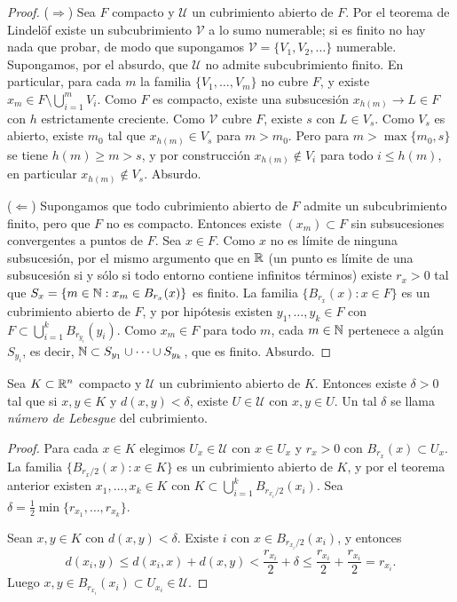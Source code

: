 \begin{proof}
  (\(\Rightarrow\)) Sea \(F\) compacto y \(\mathscr{U}\) un cubrimiento abierto de \(F\). Por el teorema de Lindelöf existe un subcubrimiento \(\mathscr{V}\) a lo sumo numerable; si es finito no hay nada que probar, de modo que supongamos \(\mathscr{V} = \{ V_1, V_2, \dots \}\) numerable. Supongamos, por el absurdo, que \(\mathscr{U}\) no admite subcubrimiento finito. En particular, para cada \(m\) la familia \(\{ V_1, \dots, V_m \}\) no cubre \(F\), y existe \(x_m \in F \setminus \bigcup_{i=1}^{m} V_i\). Como \(F\) es compacto, existe una subsucesión \(x_{h(m)} \to L \in F\) con \(h\) estrictamente creciente. Como \(\mathscr{V}\) cubre \(F\), existe \(s\) con \(L \in V_s\). Como \(V_s\) es abierto, existe \(m_0\) tal que \(x_{h(m)} \in V_s\) para \(m > m_0\). Pero para \(m > \max\{m_0, s\}\) se tiene \(h(m) \geq m > s\), y por construcción \(x_{h(m)} \notin V_i\) para todo \(i \leq h(m)\), en particular \(x_{h(m)} \notin V_s\). Absurdo.

  (\(\Leftarrow\)) Supongamos que todo cubrimiento abierto de \(F\) admite un subcubrimiento finito, pero que \(F\) no es compacto. Entonces existe \({(x_m)} \subset F\) sin subsucesiones convergentes a puntos de \(F\). Sea \(x \in F\). Como \(x\) no es límite de ninguna subsucesión, por el mismo argumento que en \(\mathbb{R}\) (un punto es límite de una subsucesión si y sólo si todo entorno contiene infinitos términos) existe \(r_x > 0\) tal que \(S_x = \{ m \in \mathbb{N} : x_m \in B_{r_x}(x) \}\) es finito. La familia \(\{ B_{r_x}(x) : x \in F \}\) es un cubrimiento abierto de \(F\), y por hipótesis existen \(y_1, \dots, y_k \in F\) con \(F \subset \bigcup_{i=1}^{k} B_{r_{y_i}}(y_i)\). Como \(x_m \in F\) para todo \(m\), cada \(m \in \mathbb{N}\) pertenece a algún \(S_{y_i}\), es decir, \(\mathbb{N} \subset S_{y_1} \cup \cdots \cup S_{y_k}\), que es finito. Absurdo.
\end{proof}

\begin{prop}
  Sea \(K \subset \mathbb{R}^n\) compacto y \(\mathscr{U}\) un cubrimiento abierto de \(K\). Entonces existe \(\delta > 0\) tal que si \(x, y \in K\) y \(d(x, y) < \delta\), existe \(U \in \mathscr{U}\) con \(x, y \in U\). Un tal \(\delta\) se llama \emph{número de Lebesgue} del cubrimiento.
\end{prop}

\begin{proof}
  Para cada \(x \in K\) elegimos \(U_x \in \mathscr{U}\) con \(x \in U_x\) y \(r_x > 0\) con \(B_{r_x}(x) \subset U_x\). La familia \(\bigl\{ B_{r_x/2}(x) : x \in K \bigr\}\) es un cubrimiento abierto de \(K\), y por el teorema anterior existen \(x_1, \dots, x_k \in K\) con \(K \subset \bigcup_{i=1}^{k} B_{r_{x_i}/2}(x_i)\). Sea \(\delta = \frac{1}{2} \min\{ r_{x_1}, \dots, r_{x_k} \}\).

  Sean \(x, y \in K\) con \(d(x, y) < \delta\). Existe \(i\) con \(x \in B_{r_{x_i}/2}(x_i)\), y entonces
  \[
    d(x_i, y) \leq d(x_i, x) + d(x, y) < \frac{r_{x_i}}{2} + \delta \leq \frac{r_{x_i}}{2} + \frac{r_{x_i}}{2} = r_{x_i}.
  \]
  Luego \(x, y \in B_{r_{x_i}}(x_i) \subset U_{x_i} \in \mathscr{U}\).
\end{proof}
